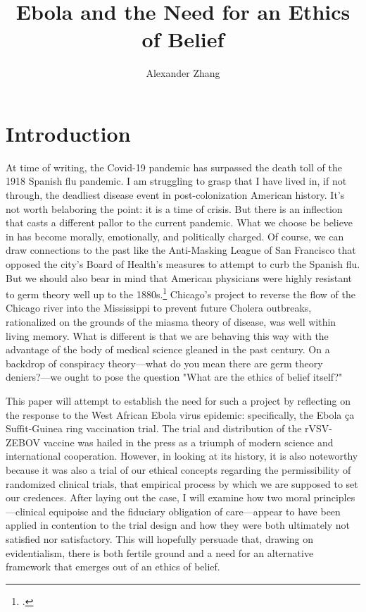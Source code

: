 \documentclass[letterpaper,notitlepage,12pt]{article}
\title{Ebola and the Need for an Ethics of Belief}
\author{Alexander Zhang}
\date{}
\begin{document}
\maketitle

\section{Introduction}

At time of writing, the Covid-19 pandemic has surpassed the death toll of
the 1918 Spanish flu pandemic.
I am struggling to grasp that I have lived in, if not through, the deadliest
disease event in post-colonization American history.
It's not worth belaboring the point: it is a time of crisis.
But there is an inflection that casts a different pallor to the current
pandemic.
What we choose be believe in has become morally, emotionally, and politically
charged.
Of course, we can draw connections to the past like the Anti-Masking League of
San Francisco that opposed the city's Board of Health's measures to attempt to
curb the Spanish flu.
But we should also bear in mind that American physicians were highly resistant
to germ theory well up to the 1880s.\footcite{tomes}
Chicago's project to reverse the flow of the Chicago river into the Mississippi
to prevent future Cholera outbreaks, rationalized on the grounds of the miasma
theory of disease, was well within living memory.
What is different is that we are behaving this way with the advantage of the
body of medical science gleaned in the past century.
On a backdrop of conspiracy theory---what do you mean there are germ theory
deniers?---we ought to pose the question "What are the ethics of belief itself?"

This paper will attempt to establish the need for such a project by reflecting 
on the response to the West African Ebola virus epidemic: specifically, the 
Ebola \c{c}a Suffit-Guinea ring vaccination trial.
The trial and distribution of the rVSV-ZEBOV vaccine was hailed in the press as
a triumph of modern science and international cooperation.
However, in looking at its history, it is also noteworthy because it was also a
trial of our ethical concepts regarding the permissibility of randomized
clinical trials, that empirical process by which we are supposed to set our
credences.
After laying out the case, I will examine how two moral principles---clinical
equipoise and the fiduciary obligation of care---appear to have been applied in
contention to the trial design and how they were both ultimately not satisfied
nor satisfactory.
This will hopefully persuade that, drawing on evidentialism, there is both
fertile ground and a need for an alternative framework that emerges out of an
ethics of belief.
\end{document}
